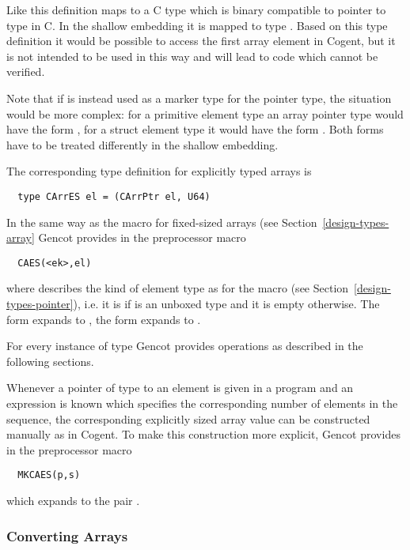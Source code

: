 Like  this definition maps to a C type which is binary compatible to pointer to type  in C. In the 
shallow embedding it is mapped to type . Based on this type definition it would be possible to access the 
first array element in Cogent, but it is not intended to be used in this way and will lead to code which cannot be verified.

Note that if  is instead used as a marker type for the pointer type, the situation would 
be more complex: for a primitive element type an array pointer type would have the form ,
for a struct element type  it would have the form . Both forms have to be treated 
differently in the shallow embedding.

The corresponding type definition for explicitly typed arrays is
\begin{verbatim}
  type CArrES el = (CArrPtr el, U64)
\end{verbatim}

In the same way as the macro  for fixed-sized arrays (see Section~\ref{design-types-array} Gencot provides in 
 the preprocessor macro
\begin{verbatim}
  CAES(<ek>,el)
\end{verbatim}
where  describes the kind of element type as for the macro  (see Section~\ref{design-types-pointer}),
i.e. it is  if  is an unboxed type and it is empty otherwise. The form  expands to
, the form  expands to .

For every instance of type  Gencot provides operations as described in the following sections.

Whenever a pointer  of type  to an element is given in a program and an expression  
is known which specifies the corresponding number of elements in the sequence, the corresponding explicitly sized array value 
can be constructed manually as  in Cogent. To make this construction more explicit, Gencot provides in 
 the preprocessor macro
\begin{verbatim}
  MKCAES(p,s)
\end{verbatim}
which expands to the pair .

\subsubsection{Converting Arrays}

